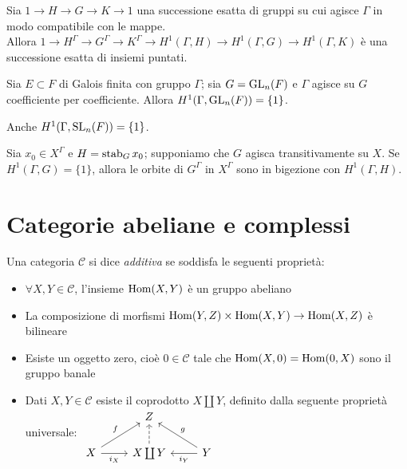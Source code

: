 \begin{proposition}
    Sia $1\rightarrow H\rightarrow G\rightarrow K\rightarrow 1$ una successione esatta di gruppi su cui agisce $\Gamma$ in modo compatibile con le mappe.\\
    Allora $1\rightarrow H^\Gamma\rightarrow G^\Gamma\rightarrow K^\Gamma\rightarrow H^1(\Gamma, H)\rightarrow H^1(\Gamma, G)\rightarrow H^1(\Gamma, K)$ è una successione esatta di insiemi puntati.
\end{proposition}

\begin{theorem}[Hilbert 90]
    Sia $E\subset F$ di Galois finita con gruppo $\Gamma$; sia $G=\operatorname{GL}_n(F)$ e $\Gamma$ agisce su $G$ coefficiente per coefficiente. Allora $H^1(\Gamma,\operatorname{GL}_n(F))=\{1\}$.
\end{theorem}

\begin{corollary}
    Anche $H^1(\Gamma,\operatorname{SL}_n(F))=\{1\}$.
\end{corollary}

\begin{proposition}
    Sia $x_0\in X^\Gamma$ e $H=\operatorname{stab}_G x_0$; supponiamo che $G$ agisca transitivamente su $X$. Se $H^1(\Gamma, G)=\{1\}$, allora le orbite di $G^\Gamma$ in $X^\Gamma$ sono in bigezione con $H^1(\Gamma, H)$.
\end{proposition}



\section{Categorie abeliane e complessi}

\begin{definition}
    Una categoria $\mathcal{C}$ si dice \emph{additiva} se soddisfa le seguenti proprietà:
    \begin{itemize}
        \item $\forall X,Y\in\mathcal{C}$, l'insieme $\operatorname{Hom}(X,Y)$ è un gruppo abeliano
        \item La composizione di morfismi $\operatorname{Hom}(Y,Z)\times\operatorname{Hom}(X,Y)\to\operatorname{Hom}(X,Z)$ è bilineare
        \item Esiste un oggetto zero, cioè $0\in\mathcal C$ tale che $\operatorname{Hom}(X,0)=\operatorname{Hom}(0,X)$ sono il gruppo banale
        \item Dati $X,Y\in\mathcal C$ esiste il coprodotto $X\coprod Y$, definito dalla seguente proprietà universale:
        $\begin{tikzcd}
         & Z & \\
         X \ar[r,"i_X"'] \ar[ur, "f"] & X\coprod Y \ar[u,dashrightarrow] & Y \ar[l,"i_Y"] \ar[ul, "g"']
        \end{tikzcd}$
    \end{itemize}
\end{definition}

